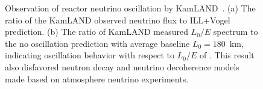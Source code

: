     \begin{figure}[h!]
    \centering
    \caption[Confirmation of Reactor Neutrino Oscillation by KamLAND]{Observation of reactor neutrino oscillation by KamLAND~\cite{bib:kamland04}.
    (a) The ratio of the KamLAND observed neutrino flux to ILL+Vogel prediction.
    (b) The ratio of KamLAND measured $L_0/E$ spectrum to the no oscillation prediction with average baseline $L_0 = 180$~km, indicating oscillation behavior with respect to $L_0/E$ of \nuebar.
    This result also disfavored neutron decay and neutrino decoherence models made based on atmosphere neutrino experiments.}
    \label{fig:Kamland}
    \end{figure}
    

